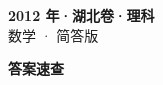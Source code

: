 \documentclass[zihao=-4, a4paper]{ctexart}
\begin{document}
\begin{center}
  {\Large\bfseries 2012 年·湖北卷·理科}\\[4pt]
  {\large 数学 · 简答版}
\end{center}
\medskip
{}

\clearpage
{}
\begin{center}{\Large\bfseries 答案速查}\end{center}
\medskip

\end{document}
